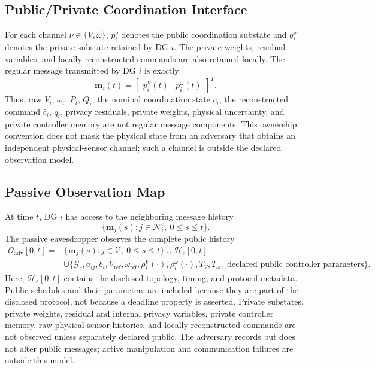 \documentclass[journal]{IEEEtran}
\begin{document}
\subsection{Public/Private Coordination Interface}

For each channel $\nu\in\{V,\omega\}$, $p_i^\nu$ denotes the public coordination substate and $q_i^\nu$ denotes the private substate retained by DG $i$. The private weights, residual variables, and locally reconstructed commands are also retained locally. The regular message transmitted by DG $i$ is exactly
\begin{equation}
\bm{m}_i(t)=
\begin{bmatrix}p_i^V(t)&p_i^\omega(t)\end{bmatrix}^{T}.
\label{eq:public_message}
\end{equation}
Thus, raw $V_i$, $\omega_i$, $P_i$, $Q_i$, the nominal coordination state $c_i$, the reconstructed command $\widehat c_i$, $q_i$, privacy residuals, private weights, physical uncertainty, and private controller memory are not regular message components. This ownership convention does not mask the physical state from an adversary that obtains an independent physical-sensor channel; such a channel is outside the declared observation model.

\subsection{Passive Observation Map}

At time $t$, DG $i$ has access to the neighboring message history
\begin{equation}
\{\bm{m}_j(s):j\in\mathcal N_i^c,\ 0\leq s\leq t\}.
\label{eq:neighbor_history}
\end{equation}
The passive eavesdropper observes the complete public history
\begin{align}
\mathcal O_{\mathrm{adv}}[0,t]
={}&\{\bm{m}_j(s):j\in\mathcal V,\ 0\leq s\leq t\}
\cup \mathcal H_c[0,t]\nonumber\\
&\cup\{\mathcal G_c,a_{ij},b_i,V_{\mathrm{ref}},
\omega_{\mathrm{ref}},\rho_i^V(\cdot),\rho_i^\omega(\cdot),
T_V,T_\omega,\text{ declared public controller parameters}\}.
\label{eq:adversary_history}
\end{align}
Here, $\mathcal H_c[0,t]$ contains the disclosed topology, timing, and protocol metadata. Public schedules and their parameters are included because they are part of the disclosed protocol, not because a deadline property is asserted. Private substates, private weights, residual and internal privacy variables, private controller memory, raw physical-sensor histories, and locally reconstructed commands are not observed unless separately declared public. The adversary records but does not alter public messages; active manipulation and communication failures are outside this model.
\end{document}

